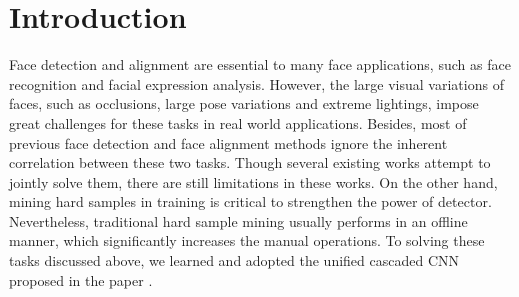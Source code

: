 \documentclass[journal, a4paper]{IEEEtran}
\begin{document}
\section{Introduction}
Face detection and alignment are essential to many face applications, such as face recognition and facial expression analysis. However, the large visual variations of faces, such as occlusions, large pose variations and extreme lightings, impose great challenges for these tasks in real world applications. Besides, most of previous face detection and face alignment methods ignore the inherent correlation between these two tasks. Though several existing works attempt to jointly solve them, there are still limitations in these works. On the other hand, mining hard samples in training is critical to strengthen the power of detector. Nevertheless, traditional hard sample mining usually performs in an offline manner, which significantly increases the manual operations. To solving these tasks discussed above, we learned and adopted the unified cascaded CNN proposed in the paper \cite{1}.
%		
\end{document}
